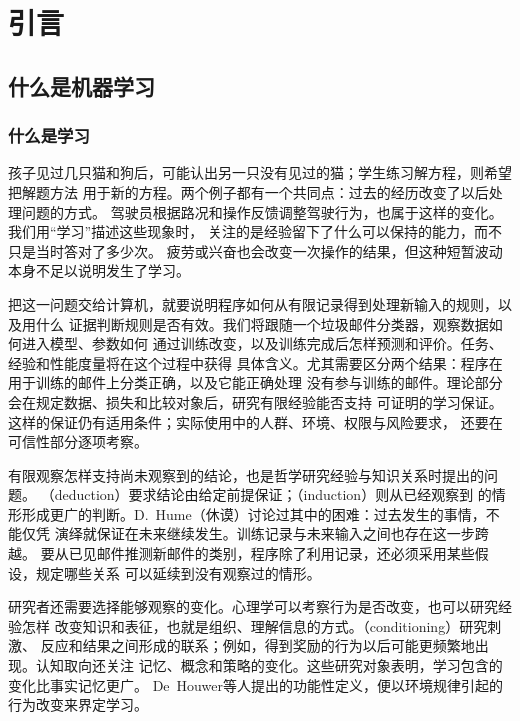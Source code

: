 \chapter{引言}
\label{chap:introduction}

\section{什么是机器学习}
\label{sec:what-is-machine-learning}

\subsection{什么是学习}

孩子见过几只猫和狗后，可能认出另一只没有见过的猫；学生练习解方程，则希望把解题方法
用于新的方程。两个例子都有一个共同点：过去的经历改变了以后处理问题的方式。
驾驶员根据路况和操作反馈调整驾驶行为，也属于这样的变化。我们用“学习”描述这些现象时，
关注的是经验留下了什么可以保持的能力，而不只是当时答对了多少次。
疲劳或兴奋也会改变一次操作的结果，但这种短暂波动本身不足以说明发生了学习。

把这一问题交给计算机，就要说明程序如何从有限记录得到处理新输入的规则，以及用什么
证据判断规则是否有效。我们将跟随一个垃圾邮件分类器，观察数据如何进入模型、参数如何
通过训练改变，以及训练完成后怎样预测和评价。任务、经验和性能度量将在这个过程中获得
具体含义。尤其需要区分两个结果：程序在用于训练的邮件上分类正确，以及它能正确处理
没有参与训练的邮件。理论部分会在规定数据、损失和比较对象后，研究有限经验能否支持
可证明的学习保证。这样的保证仍有适用条件；实际使用中的人群、环境、权限与风险要求，
还要在可信性部分逐项考察。

有限观察怎样支持尚未观察到的结论，也是哲学研究经验与知识关系时提出的问题。
（deduction）要求结论由给定前提保证；（induction）则从已经观察到
的情形形成更广的判断。D.~Hume（休谟）讨论过其中的困难：过去发生的事情，不能仅凭
演绎就保证在未来继续发生。训练记录与未来输入之间也存在这一步跨越。
要从已见邮件推测新邮件的类别，程序除了利用记录，还必须采用某些假设，规定哪些关系
可以延续到没有观察过的情形。

研究者还需要选择能够观察的变化。心理学可以考察行为是否改变，也可以研究经验怎样
改变知识和表征，也就是组织、理解信息的方式。（conditioning）研究刺激、
反应和结果之间形成的联系；例如，得到奖励的行为以后可能更频繁地出现。认知取向还关注
记忆、概念和策略的变化。这些研究对象表明，学习包含的变化比事实记忆更广。
De~Houwer等人提出的功能性定义，便以环境规律引起的行为改变来界定学习。

